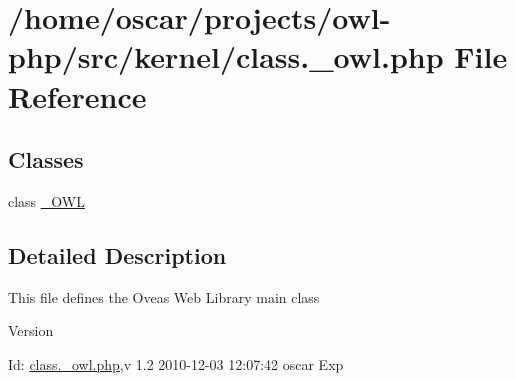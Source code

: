 \section{/home/oscar/projects/owl-\/php/src/kernel/class.\_\-owl.php File Reference}
\label{class_8__owl_8php}
\subsection*{Classes}
\begin{DoxyCompactItemize}
\item 
class \hyperlink{class__OWL}{\_\-OWL}
\end{DoxyCompactItemize}


\subsection{Detailed Description}
This file defines the Oveas Web Library main class \begin{DoxyVersion}{Version}

\end{DoxyVersion}
\begin{DoxyParagraph}{Id:}
\hyperlink{class_8__owl_8php}{class.\_\-owl.php},v 1.2 2010-\/12-\/03 12:07:42 oscar Exp 
\end{DoxyParagraph}
